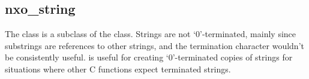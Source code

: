 %
%
%
%
%              

\subsection{nxo\_string}
\label{nxo_string}

The  class is a subclass of the  class.
Strings are not `{\bs}0'-terminated, mainly since substrings are references to
other strings, and the termination character wouldn't be consistently useful.
 is useful for creating `{\bs}0'-terminated copies
of strings for situations where other C functions expect terminated strings.

